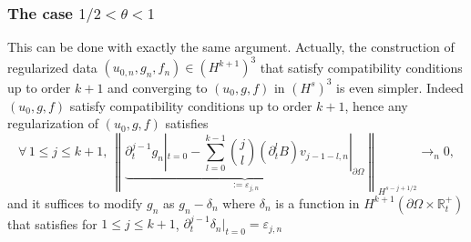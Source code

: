 \documentclass[AHL,Unicode,longabstracts,published]{cedram}
\newcommand{\R}{\mathbb{R}}
\let\oldforall\forall
\renewcommand*{\forall}{\mathrel{\oldforall}}
\begin{document}
\subsubsection{The case $1/2<\theta<1$}
This can be done with exactly the same argument. Actually, the construction of regularized data $(u_{0,n},g_n,f_n)\in (H^{k+1})^3$ that satisfy compatibility conditions up to order $k+1$ and converging to $(u_0,g,f)$ in $(H^s)^3$ is even simpler. Indeed $(u_0,g,f)$ satisfy compatibility conditions up to order $k+1$, hence any regularization of $(u_0,g,f)$ satisfies
\[
\forall\,1\leq j\leq k+1,\
\left\|\underbrace{\partial_t^{j-1}g_n|_{t=0} -\sum_{l=0}^{k-1}\binom{j}{l} \left(\partial_t^lB\right)v_{j-1-l,n}|_{\partial\Omega}}_{:=\varepsilon_{j,n}}\right\|_{H^{s-j+1/2}}\longrightarrow_{n} 0,
\]
and it suffices to modify $g_n$ as $g_n-\delta_n$ where $\delta_n$ is a function in $H^{k+1}(\partial\Omega\times\R_t^+)$ that satisfies for $1\leq j\leq k+1$, $\partial_t^{j-1}\delta_n|_{t=0}=\varepsilon_{j,n}$
\end{document}
